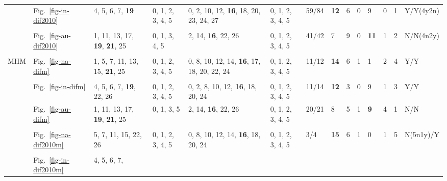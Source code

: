 \begin{table*}
{\begin{tabular}{l|l|l|l|l|l|l|l|l|l|l|l|l|l}
& Fig.~\ref{fig-in-dif2010} & \multirow{2}{*}{\parbox{2cm}{4, 5, 6, 7,
  \textbf{19}}} & \multirow{2}{*}{\parbox{1cm}{0, 1, 2, 3, 4, 5}} &
  \multirow{2}{*}{\parbox{2.4cm}{0, 2, 10, 12, \textbf{16}, 18, 20, 23, 24, 27}} &
  \multirow{2}{*}{\parbox{1cm}{0, 1, 2, 3, 4, 5}} & 59/84 & \textbf{12} & 6 & 0 & 9 & 0
  & 1 & Y/Y(4y2n) \\ \\ \cline{2-14}
& Fig.~\ref{fig-au-dif2010} & \multirow{2}{*}{\parbox{2cm}{1, 11, 13, 17,
\textbf{19}, \textbf{21}, 25}} & \multirow{2}{*}{\parbox{1cm}{0, 1, 3, 4, 5}} &
  \multirow{2}{*}{\parbox{2cm}{2, 14, \textbf{16}, 22, 26}} &
  \multirow{2}{*}{\parbox{1cm}{0, 1, 2, 3, 4, 5}} & 41/42 & 7 & 9 & 0 & \textbf{11} & 1
  & 2 & N/N(4n2y) \\ \\ \hline
\multirow{12}{*}{MHM}
& Fig.~\ref{fig-na-difm} & \multirow{2}{*}{\parbox{2cm}{1, 5, 7, 11, 13, 15,
  \textbf{21}, 25}} & \multirow{2}{*}{\parbox{1cm}{0, 1, 2, 3, 4, 5}} &
  \multirow{2}{*}{\parbox{2.2cm}{0, 8, 10, 12, 14, \textbf{16}, 17, 18, 20, 22, 24}} &
  \multirow{2}{*}{\parbox{1cm}{0, 1, 2, 3, 4, 5}} & 11/12 & \textbf{14} & 6 & 1 & 1 & 2
  & 4 & Y/Y \\ \\ \cline{2-14}
& Fig.~\ref{fig-in-difm} & \multirow{2}{*}{\parbox{2cm}{4, 5, 6, 7, \textbf{19}, 22, 26}} &
  \multirow{2}{*}{\parbox{1cm}{0, 1, 2, 3, 4, 5}} &
  \multirow{2}{*}{\parbox{2.4cm}{0, 2, 8, 10, 12, \textbf{16}, 18, 20, 24}} &
  \multirow{2}{*}{\parbox{1cm}{0, 1, 2, 3, 4, 5}} & 11/14 & \textbf{12} & 3 & 0 & 9 & 1
  & 3 & Y/Y \\ \\ \cline{2-14}
& Fig.~\ref{fig-au-difm} & \multirow{2}{*}{\parbox{2cm}{1, 11, 13, 17,
  \textbf{19}, \textbf{21}, 25}} & \multirow{2}{*}{\parbox{1cm}{0, 1, 3, 5}} &
  \multirow{2}{*}{\parbox{2.4cm}{2, 14, \textbf{16}, 22, 26}} &
  \multirow{2}{*}{\parbox{1cm}{0, 1, 2, 3, 4, 5}} & 20/21 & 8 & 5 & 1 & \textbf{9} & 4
  & 1 & N/N \\ \\ \cline{2-14}
& Fig.~\ref{fig-na-dif2010m} & \multirow{2}{*}{\parbox{2cm}{5, 7, 11,
  15, 22, 26}} & \multirow{2}{*}{\parbox{1cm}{0, 1, 2, 3, 4, 5}} &
  \multirow{2}{*}{\parbox{2.4cm}{0, 8, 10, 12, 14, \textbf{16}, 18, 20, 24}} &
  \multirow{2}{*}{\parbox{1cm}{0, 1, 2, 3, 4, 5}} & 3/4 & \textbf{15} & 6 & 1 & 0 & 1 &
  5 & N(5n1y)/Y \\ \\ \cline{2-14}
& Fig.~\ref{fig-in-dif2010m} & \multirow{2}{*}{\parbox{2cm}{4, 5, 6, 7,
}}
\end{tabular}}
\end{table*}
